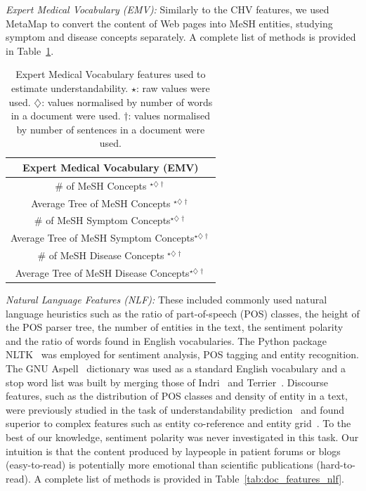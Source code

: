 \documentclass[10pt,a4paper]{article}
\begin{document}
\textit{Expert Medical Vocabulary (EMV):}
Similarly to the CHV features, we used MetaMap to convert the content of Web pages into MeSH entities, studying symptom and disease concepts separately.  A complete list of methods is provided in Table~\ref{tab:doc_features_emv}.

\begin{table}
\caption{Expert Medical Vocabulary features used to estimate understandability.
$\star$: raw values were used. $\diamondsuit$: values normalised
by number of words in a document were used. $\dagger$: values normalised
by number of sentences in a document were used.}
\label{tab:doc_features_emv} \vspace{-10pt}
\begin{tabular}{c}
\toprule 
\textbf{Expert Medical Vocabulary (EMV)}\tabularnewline
\midrule 
\# of MeSH Concepts $^{\star\diamondsuit\dagger}$ \tabularnewline
Average Tree of MeSH Concepts $^{\star\diamondsuit\dagger}$ \tabularnewline
\# of MeSH Symptom Concepts$^{\star\diamondsuit\dagger}$ \tabularnewline
Average Tree of MeSH Symptom Concepts$^{\star\diamondsuit\dagger}$ \tabularnewline
\# of MeSH Disease Concepts $^{\star\diamondsuit\dagger}$ \tabularnewline
Average Tree of MeSH Disease Concepts$^{\star\diamondsuit\dagger}$ \tabularnewline
\bottomrule
\end{tabular}
\end{table}

\textit{Natural Language Features (NLF):}
These included commonly used natural language heuristics such as the ratio of part-of-speech (POS) classes, the height of the POS parser tree, the number of entities in the text, 
the sentiment polarity~\cite{pang08} and the ratio of words found in English vocabularies. The Python package NLTK~\cite{nltk} was employed for sentiment analysis, POS tagging and entity recognition. The GNU Aspell~\cite{aspell} dictionary was used as a standard English vocabulary and a stop word list was built by merging those of Indri~\cite{indri} and Terrier~\cite{terrier}. 
Discourse features, such as the distribution of POS classes and density of entity in a text, were previously studied in the task of understandability prediction~\cite{feng10} and found superior to complex features such as entity co-reference and entity grid~\cite{barzilay08}. To the best of our knowledge, sentiment polarity was never investigated in this task. Our intuition is that the content produced by laypeople in patient forums or blogs (easy-to-read) is potentially more emotional than scientific publications (hard-to-read). A complete list of methods is provided in Table~\ref{tab:doc_features_nlf}.
\end{document}
